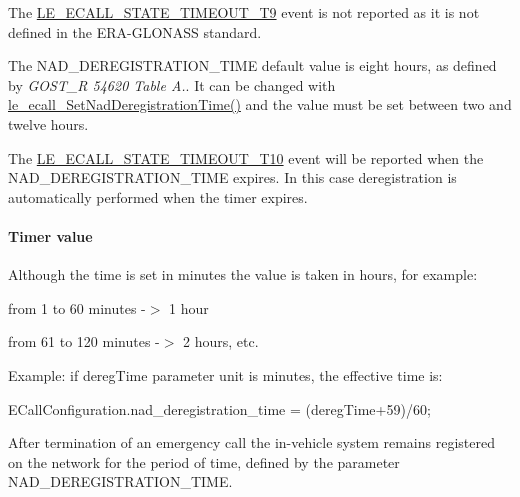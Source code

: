 \begin{DoxyItemize}
\item The \hyperlink{le__ecall__interface_8h_a233609e4724e549a1405f9177c0a07dda445e9365be6aac0b3403568d423ce6c5}{L\+E\+\_\+\+E\+C\+A\+L\+L\+\_\+\+S\+T\+A\+T\+E\+\_\+\+T\+I\+M\+E\+O\+U\+T\+\_\+\+T9} event is not reported as it is not defined in the E\+R\+A-\/\+G\+L\+O\+N\+A\+SS standard.
\item The N\+A\+D\+\_\+\+D\+E\+R\+E\+G\+I\+S\+T\+R\+A\+T\+I\+O\+N\+\_\+\+T\+I\+ME default value is eight hours, as defined by {\itshape G\+O\+S\+T\+\_\+R 54620 Table A.}. It can be changed with \hyperlink{le__ecall__interface_8h_a66e454e84db7d337d76bc867b57891a1}{le\+\_\+ecall\+\_\+\+Set\+Nad\+Deregistration\+Time()} and the value must be set between two and twelve hours.
\item The \hyperlink{le__ecall__interface_8h_a233609e4724e549a1405f9177c0a07ddadafcb8d0490beb3d2778fadcbaeb8c11}{L\+E\+\_\+\+E\+C\+A\+L\+L\+\_\+\+S\+T\+A\+T\+E\+\_\+\+T\+I\+M\+E\+O\+U\+T\+\_\+\+T10} event will be reported when the N\+A\+D\+\_\+\+D\+E\+R\+E\+G\+I\+S\+T\+R\+A\+T\+I\+O\+N\+\_\+\+T\+I\+ME expires. In this case deregistration is automatically performed when the timer expires.
\end{DoxyItemize}\hypertarget{c_SDD_eCall_le_ecall_configuration_nad_timerValue}{}\paragraph{Timer value}\label{c_SDD_eCall_le_ecall_configuration_nad_timerValue}
Although the time is set in minutes the value is taken in hours, for example\+:
\begin{DoxyItemize}
\item from 1 to 60 minutes -\/$>$ 1 hour
\item from 61 to 120 minutes -\/$>$ 2 hours, etc.
\end{DoxyItemize}

Example\+: if {\ttfamily dereg\+Time} parameter unit is minutes, the effective time is\+: 
\begin{DoxyCode}
ECallConfiguration.nad\_deregistration\_time = (deregTime+59)/60; 
\end{DoxyCode}


After termination of an emergency call the in-\/vehicle system remains registered on the network for the period of time, defined by the parameter N\+A\+D\+\_\+\+D\+E\+R\+E\+G\+I\+S\+T\+R\+A\+T\+I\+O\+N\+\_\+\+T\+I\+ME.

